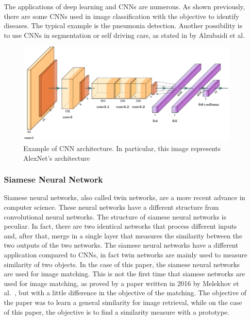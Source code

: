 \documentclass[conference]{IEEEtran}
\begin{document}
				The applications of deep learning and CNNs are numerous. As shown previously, there are some CNNs used in image classification with the objective to identify diseases. The typical example is 
				the pneumonia detection. Another possibility is to use CNNs in segmentation or self driving cars, as stated in \cite{alzubaidi2021review} by Alzubaidi et al.
		
				\begin{figure}[!ht]
					\centerline{\includegraphics[width=\linewidth]{imgs/cnn_architecture.png}}
					\caption{Example of CNN architecture. In particular, this image represents AlexNet's architecture}
					\label{fig:5}
				\end{figure}
		
			\subsubsection{Siamese Neural Network}

				Siamese neural networks, also called twin networks, are a more recent advance in computer science. These neural networks have a different structure from convolutional neural networks. The 
				structure of siamese neural networks is peculiar. In fact, there are two identical networks that process different inputs and, after that, merge in a single layer that measures the similarity between 
				the two outputs of the two networks. The siamese neural networks have a different application compared to CNNs, in fact twin networks are mainly used to measure similarity of two objects. 
				In the case of this paper, the siamese neural networks are used for image matching. This is not the first time that siamese networks are used for image matching, as proved by a paper written in 2016 by 
				Melekhov et al.~\cite{melekhov2016siamese}, but with a little difference in the objective of the matching. The objective of the paper was to learn a general similarity for image retrieval, while on the case of this 
				paper, the objective is to find a similarity measure with a prototype. 
				
\end{document}
